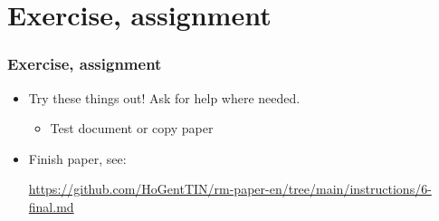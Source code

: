 \documentclass[aspectratio=169]{beamer}
\begin{document}
\section{Exercise, assignment}

\begin{frame}
  \frametitle{Exercise, assignment}

  \begin{itemize}
   \item Try these things out! Ask for help where needed.
   \begin{itemize}
       \item Test document or copy paper
   \end{itemize}
   \item Finish paper, see:
    
    \url{https://github.com/HoGentTIN/rm-paper-en/tree/main/instructions/6-final.md}
  \end{itemize}
\end{frame}
\end{document}
